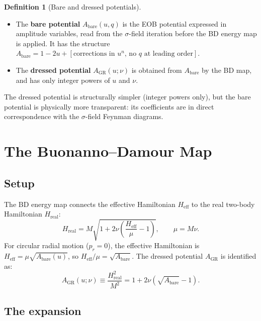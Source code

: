 \documentclass[11pt,a4paper]{article}
\theoremstyle{plain}
\theoremstyle{definition}
\newtheorem{definition}[theorem]{Definition}
\theoremstyle{remark}
\newcommand{\Heff}{H_{\mathrm{eff}}}
\newcommand{\Hreal}{H_{\mathrm{real}}}
\newcommand{\GR}{\mathrm{GR}}
\newcommand{\bare}{\mathrm{bare}}
\begin{document}
\begin{definition}[Bare and dressed potentials]
\begin{itemize}[nosep]
  \item The \textbf{bare potential} $A_\bare(u,q)$ is the EOB potential expressed
    in amplitude variables, read from the $\sigma$-field iteration before the BD
    energy map is applied.  It has the structure
    $A_\bare = 1 - 2u + [\text{corrections in }u^n\text{, no }q\text{ at leading order}]$.
  \item The \textbf{dressed potential} $A_\GR(u;\nu)$ is obtained from $A_\bare$
    by the BD map, and has only integer powers of $u$ and $\nu$.
\end{itemize}
\end{definition}

The dressed potential is structurally simpler (integer powers only), but the bare potential is physically more transparent: its coefficients are in direct correspondence with the $\sigma$-field Feynman diagrams.

\section{The Buonanno--Damour Map}
\label{sec:BD}

\subsection{Setup}

The BD energy map connects the effective Hamiltonian $\Heff$ to the real two-body Hamiltonian $\Hreal$:
\begin{equation}
  \Hreal = M\sqrt{1 + 2\nu\!\left(\frac{\Heff}{\mu} - 1\right)},
  \qquad \mu = M\nu.
  \label{eq:BD}
\end{equation}
For circular radial motion ($p_r = 0$), the effective Hamiltonian is
$\Heff = \mu\sqrt{A_\bare(u)}$, so $\Heff/\mu = \sqrt{A_\bare}$.  The dressed
potential $A_\GR$ is identified as:
\begin{equation}
  A_\GR(u;\nu) \equiv \frac{\Hreal^2}{M^2}
  = 1 + 2\nu\!\left(\sqrt{A_\bare} - 1\right).
  \label{eq:A_GR_from_A_bare}
\end{equation}

\subsection{The expansion}
\end{document}
